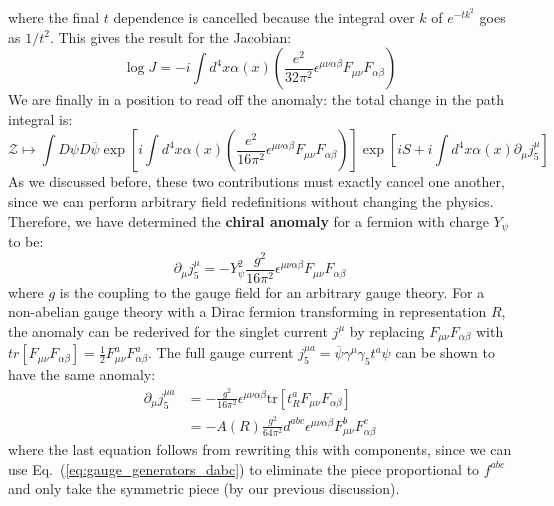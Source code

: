 \documentclass[11pt, oneside]{article}   	%
\theoremstyle{definition}
\numberwithin{equation}{subsection}		%
\begin{document}
where the final $t$ dependence is cancelled because the integral over $k$ of $e^{-t k^2}$ goes as $1 / t^2$. This gives the result for the Jacobian:
\begin{equation}
	\log J = -i\int d^4 x \alpha(x) \left(\frac{e^2}{32\pi^2}\epsilon^{\mu\nu\alpha\beta} F_{\mu\nu} F_{\alpha\beta}\right)
\end{equation}
We are finally in a position to read off the anomaly: the total change in the path integral is:
\begin{equation}
	\mathcal Z\mapsto \int D\psi D\overline\psi \exp\left[i\int d^4 x \alpha(x) \left(\frac{e^2}{16\pi^2} \epsilon^{\mu\nu\alpha\beta} F_{\mu\nu} F_{\alpha\beta}\right)\right] 
	\exp\left[iS + i\int d^4 x \alpha(x) \partial_\mu j_5^\mu\right]
\end{equation}
As we discussed before, these two contributions must exactly cancel one another, since we can perform arbitrary field redefinitions without 
changing the physics. Therefore, we have determined the \textbf{chiral anomaly} for a fermion with charge $Y_\psi$ to be:
\begin{equation}
	\partial_\mu j^\mu_5 = -Y_\psi^2 \frac{g^2}{16\pi^2}\epsilon^{\mu\nu\alpha\beta} F_{\mu\nu} F_{\alpha\beta}
\end{equation}
where $g$ is the coupling to the gauge field for an arbitrary gauge theory. For a non-abelian gauge theory with a Dirac fermion transforming 
in representation $R$, the anomaly can be rederived for the 
singlet current $j^\mu$ by replacing $F_{\mu\nu} F_{\alpha\beta}$ with $tr[F_{\mu\nu} F_{\alpha\beta}] = \frac{1}{2} F_{\mu\nu}^a F_{\alpha\beta}^a$. 
The full gauge current $j_5^{\mu a} = \overline\psi\gamma^\mu\gamma_5 t^a\psi$ can be shown to have the same anomaly:
\begin{align}
	\partial_\mu j^{\mu a}_5 &= -\frac{g^2}{16\pi^2} \epsilon^{\mu\nu\alpha\beta} \mathrm{tr}\left[ t_R^a F_{\mu\nu} F_{\alpha\beta} \right] \\
	&= - A(R) \frac{g^2}{64\pi^2} d^{abc} \epsilon^{\mu\nu\alpha\beta} F_{\mu\nu}^b F_{\alpha\beta}^c
\end{align}
where the last equation follows from rewriting this with components, since we can use Eq.~(\ref{eq:gauge_generators_dabc}) to eliminate the piece 
proportional to $f^{abc}$ and only take the symmetric piece (by our previous discussion).
\end{document}

